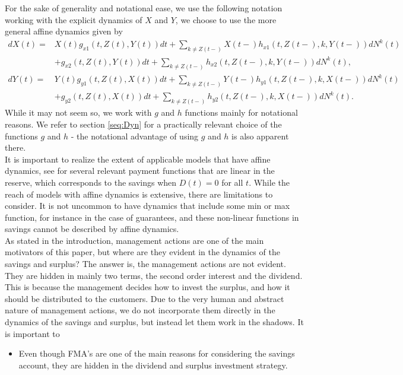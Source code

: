 \documentclass[12pt]{article}
\theoremstyle{my_thm}
\begin{document}
For the sake of generality and notational ease, we use the following notation working with the explicit dynamics of $X$ and $Y$, we choose to use the more general affine dynamics given by
\begin{align*}
dX(t)=&X(t)g_{x1}(t,Z(t),Y(t))dt + \sum_{k \neq Z(t-)} X(t-) h_{x1}(t,Z(t-),k,Y(t-)) dN^k(t)\\
&+g_{x2}(t,Z(t),Y(t))dt + \sum_{k \neq Z(t-)} h_{x2}(t,Z(t-),k,Y(t-)) dN^k(t),
\\
dY(t)=&Y(t)g_{y1}(t,Z(t),X(t))dt + \sum_{k \neq Z(t-)} Y(t-) h_{y1}(t,Z(t-),k,X(t-)) dN^k(t)
\\
&+g_{y2}(t,Z(t),X(t))dt + \sum_{k \neq Z(t-)} h_{y2}(t,Z(t-),k,X(t-)) dN^k(t).
\end{align*}
While it may not seem so, we work with $g$ and $h$ functions mainly for notational reasons. We refer to section \ref{seq:Dyn} for a practically relevant choice of the functions $g$ and $h$ - the notational advantage of using $g$ and $h$ is also apparent there.
\\[12pt]
It is important to realize the extent of applicable models that have affine dynamics, see \citet{Christiansen} for several relevant payment functions that are linear in the reserve, which corresponds to the savings when $D(t)=0$ for all $t$. While the reach of models with affine dynamics is extensive, there are limitations to consider. It is not uncommon to have dynamics that include some min or max function, for instance in the case of guarantees, and these non-linear functions in savings cannot be described by affine dynamics. \\
As stated in the introduction, management actions are one of the main motivators of this paper, but where are they evident in the dynamics of the savings and surplus? The answer is, the management actions are not evident. They are hidden in mainly two terms, the second order interest and the dividend. This is because the management decides how to invest the surplus, and how it should be distributed to the customers. Due to the very human and abstract nature of management actions, we do not incorporate them directly in the dynamics of the savings and surplus, but instead let them work in the shadows. It is important to 


\begin{itemize}
\item Even though FMA's are one of the main reasons for considering the savings account, they are hidden in the dividend and surplus investment strategy.
\end{itemize}
\end{document}
